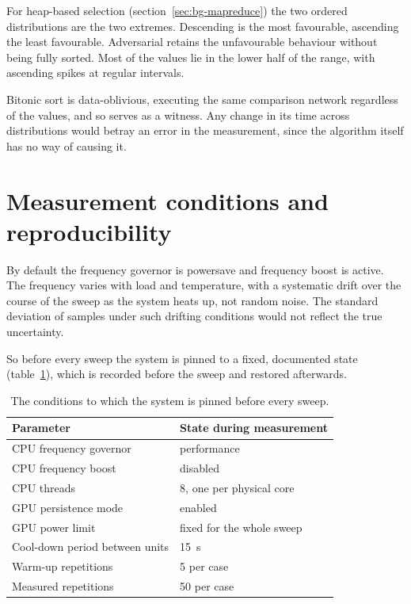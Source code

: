 
For heap-based selection (section~\ref{sec:bg-mapreduce}) the two ordered
distributions are the two extremes. Descending is the most favourable,
ascending the least favourable. Adversarial retains the unfavourable behaviour
without being fully sorted. Most of the values lie in the lower half of the
range, with ascending spikes at regular intervals.

Bitonic sort is data-oblivious, executing the same comparison network
regardless of the values, and so serves as a witness. Any change in its time
across distributions would betray an error in the measurement, since the
algorithm itself has no way of causing it.

\section{Measurement conditions and reproducibility}
\label{sec:meth-conditions}

By default the frequency governor is powersave and frequency boost is active.
The frequency varies with load and temperature, with a systematic drift over
the course of the sweep as the system heats up, not random noise. The standard
deviation of samples under such drifting conditions would not reflect the true
uncertainty.

So before every sweep the system is pinned to a fixed, documented state
(table~\ref{tab:conditions}), which is recorded before the sweep and restored
afterwards.

\begin{table}[H]
    \centering
    \begin{tabular}{ll}
        \toprule
        Parameter & State during measurement \\
        \midrule
        CPU frequency governor & performance \\
        CPU frequency boost & disabled \\
        CPU threads & 8, one per physical core \\
        GPU persistence mode & enabled \\
        GPU power limit & fixed for the whole sweep \\
        Cool-down period between units & \qty{15}{\second} \\
        Warm-up repetitions & 5 per case \\
        Measured repetitions & 50 per case \\
        \bottomrule
    \end{tabular}
    \caption{The conditions to which the system is pinned before every
    sweep.}
    \label{tab:conditions}
\end{table}


